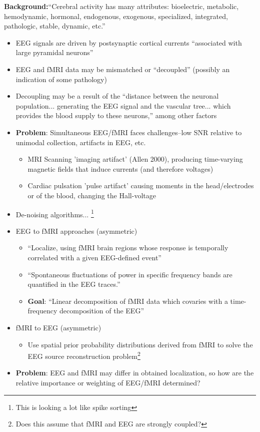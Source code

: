 \documentclass{article}
\begin{document}
            \textbf{Background:}``Cerebral activity has many attributes: bioelectric,
            metabolic, hemodynamic, hormonal, endogenous, exogenous, specialized, 
    integrated,
            pathologic, stable, dynamic, etc.'' 

            \begin{itemize}
                \item EEG signals are driven by postsynaptic cortical currents 
    ``associated with
                large pyramidal neurons''
                \item EEG and fMRI data may be mismatched or ``decoupled''
(possibly an indication of some pathology)
                \item Decoupling may be a result of the ``distance between the
neuronal population... generating the EEG signal and the vascular tree... which
provides the blood supply to these neurons,'' among other factors
                \item \textbf{Problem}: Simultaneous EEG/fMRI faces
challenges--low SNR relative to unimodal collection, artifacts in EEG, etc.
                \begin{itemize}
                    \item MRI Scanning 'imaging artifact' (Allen 2000),
producing time-varying magnetic fields that induce currents (and therefore
voltages)
                    \item Cardiac pulsation 'pulse artifact' causing moments in
the head/electrodes or of the blood, changing the Hall-voltage
                \end{itemize}
                \item De-noising algorithms... \footnote{This is looking a lot
like spike sorting}
                \item EEG to fMRI approaches (asymmetric)
                \begin{itemize}
                    \item ``Localize, using fMRI brain regions whose response is
temporally correlated with a given EEG-defined event''
                    \item ``Spontaneous fluctuations of power in specific
frequency bands are quantified in the EEG traces.''
                    \item \textbf{Goal}: ``Linear decomposition of fMRI data
which covaries with a time-frequency decomposition of the EEG''
                \end{itemize}                    
                \item fMRI to EEG (asymmetric)
                \begin{itemize}
                    \item Use spatial prior probability distributions derived
from fMRI to solve the EEG source reconstruction problem\footnote{Does this
assume that fMRI and EEG are strongly coupled?}      
                \end{itemize}
                \item \textbf{Problem}: EEG and fMRI may differ in obtained
localization, so how are the relative importance or weighting of EEG/fMRI
determined?
            \end{itemize}
\end{document}

